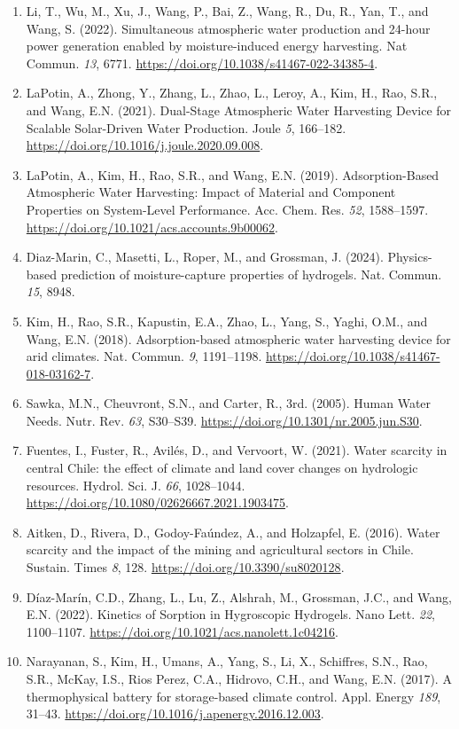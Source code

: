 \documentclass[11pt]{article}
\begin{document}
\begin{enumerate}[leftmargin=2em,itemsep=0.25em]
\item Li, T., Wu, M., Xu, J., Wang, P., Bai, Z., Wang, R., Du, R., Yan, T., and Wang, S. (2022). Simultaneous atmospheric water production and 24-hour power generation enabled by moisture-induced energy harvesting. Nat Commun. \textit{13}, 6771. \url{https://doi.org/10.1038/s41467-022-34385-4}.
\item LaPotin, A., Zhong, Y., Zhang, L., Zhao, L., Leroy, A., Kim, H., Rao, S.R., and Wang, E.N. (2021). Dual-Stage Atmospheric Water Harvesting Device for Scalable Solar-Driven Water Production. Joule \textit{5}, 166--182. \url{https://doi.org/10.1016/j.joule.2020.09.008}.
\item LaPotin, A., Kim, H., Rao, S.R., and Wang, E.N. (2019). Adsorption-Based Atmospheric Water Harvesting: Impact of Material and Component Properties on System-Level Performance. Acc. Chem. Res. \textit{52}, 1588--1597. \url{https://doi.org/10.1021/acs.accounts.9b00062}.
\item Diaz-Marin, C., Masetti, L., Roper, M., and Grossman, J. (2024). Physics-based prediction of moisture-capture properties of hydrogels. Nat. Commun. \textit{15}, 8948.
\item Kim, H., Rao, S.R., Kapustin, E.A., Zhao, L., Yang, S., Yaghi, O.M., and Wang, E.N. (2018). Adsorption-based atmospheric water harvesting device for arid climates. Nat. Commun. \textit{9}, 1191--1198. \url{https://doi.org/10.1038/s41467-018-03162-7}.
\item Sawka, M.N., Cheuvront, S.N., and Carter, R., 3rd. (2005). Human Water Needs. Nutr. Rev. \textit{63}, S30--S39. \url{https://doi.org/10.1301/nr.2005.jun.S30}.
\item Fuentes, I., Fuster, R., Avilés, D., and Vervoort, W. (2021). Water scarcity in central Chile: the effect of climate and land cover changes on hydrologic resources. Hydrol. Sci. J. \textit{66}, 1028--1044. \url{https://doi.org/10.1080/02626667.2021.1903475}.
\item Aitken, D., Rivera, D., Godoy-Faúndez, A., and Holzapfel, E. (2016). Water scarcity and the impact of the mining and agricultural sectors in Chile. Sustain. Times \textit{8}, 128. \url{https://doi.org/10.3390/su8020128}.
\item Díaz-Marín, C.D., Zhang, L., Lu, Z., Alshrah, M., Grossman, J.C., and Wang, E.N. (2022). Kinetics of Sorption in Hygroscopic Hydrogels. Nano Lett. \textit{22}, 1100--1107. \url{https://doi.org/10.1021/acs.nanolett.1c04216}.
\item Narayanan, S., Kim, H., Umans, A., Yang, S., Li, X., Schiffres, S.N., Rao, S.R., McKay, I.S., Rios Perez, C.A., Hidrovo, C.H., and Wang, E.N. (2017). A thermophysical battery for storage-based climate control. Appl. Energy \textit{189}, 31--43. \url{https://doi.org/10.1016/j.apenergy.2016.12.003}.

\end{enumerate}
\end{document}
